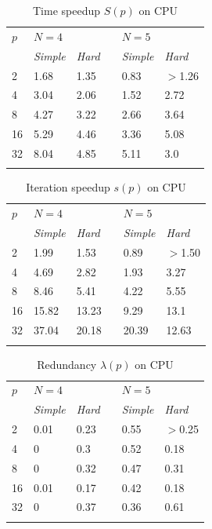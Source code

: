 \documentclass[smallcondensed]{svjour3}     %
\begin{document}
\begin{table}
	\caption{Time speedup $S(p)$ on CPU}
	\label{tab:6}
	\center
	\begin{tabular}{llllll}
		\hline\noalign{\smallskip}
		$p$ & \multicolumn{2}{l}{ $N=4$ } & & \multicolumn{2}{l}{$N=5$} \\
		\noalign{\smallskip} \cline{2-3} \cline{5-6} \noalign{\smallskip}
		 & \textit{Simple} & \textit{Hard} & & \textit{Simple} & \textit{Hard}  \\
		\noalign{\smallskip} \hline \noalign{\smallskip}
		2 &	1.68 &	1.35 & &	0.83 &	$>$1.26 \\
		4 &	3.04 &	2.06 & &	1.52 &	2.72 \\
		8 &	4.27 &	3.22 & &	2.66 &	3.64 \\
		16 &	5.29 &	4.46 & &	3.36 &	5.08 \\
		32 &	8.04 &	4.85 & &	5.11 &	3.0 \\
		\noalign{\smallskip}\hline
	\end{tabular}
\end{table}


\begin{table}
	\caption{Iteration speedup $s(p)$ on CPU}
	\label{tab:7}
	\center
	\begin{tabular}{llllll}
		\hline\noalign{\smallskip}
		$p$ & \multicolumn{2}{l}{ $N=4$ } & & \multicolumn{2}{l}{$N=5$} \\
		\noalign{\smallskip} \cline{2-3} \cline{5-6} \noalign{\smallskip}
		 & \textit{Simple} & \textit{Hard} & & \textit{Simple} & \textit{Hard}  \\
		\noalign{\smallskip} \hline \noalign{\smallskip}
		2 &	1.99 & 1.53 & &	0.89 &	$>$1.50 \\
		4 &	4.69 &	2.82 & &	1.93 &	3.27 \\
		8 &	8.46 &	5.41 & &	4.22 &	5.55 \\
		16 &	15.82 &	13.23 & &	9.29 &	13.1 \\
		32 &	37.04 &	20.18 & &	20.39 &	12.63 \\
		\noalign{\smallskip}\hline
	\end{tabular}
\end{table}

\begin{table}
	\caption{Redundancy $\lambda(p)$ on CPU}
	\label{tab:8}
	\center
	\begin{tabular}{llllll}
		\hline\noalign{\smallskip}
		$p$ & \multicolumn{2}{l}{ $N=4$ } & & \multicolumn{2}{l}{$N=5$} \\
		\noalign{\smallskip} \cline{2-3} \cline{5-6} \noalign{\smallskip}
		 & \textit{Simple} & \textit{Hard} & & \textit{Simple} & \textit{Hard}  \\
		\noalign{\smallskip} \hline \noalign{\smallskip}
2 &	0.01 & 0.23 & &	0.55 &	$>$0.25 \\
4 &	0 &	0.3 & &	0.52	& 0.18 \\
8 &	0 &	0.32 & &	0.47  &	0.31 \\
16 &	0.01 &	0.17& &	0.42  &	0.18 \\
32 &	0 &	0.37 & &	0.36  &	0.61 \\
		\noalign{\smallskip}\hline
	\end{tabular}
\end{table}
\end{document}

